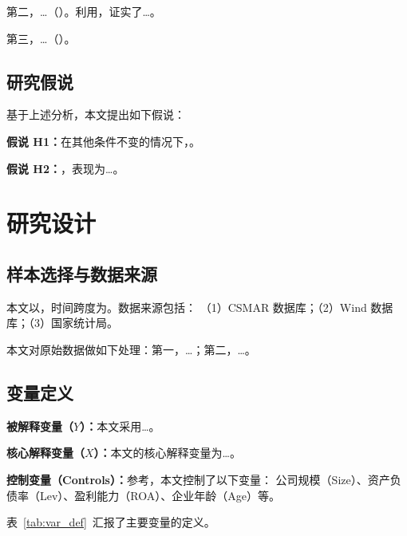 \documentclass[lang=cn, alanguage={chinese}, aaffiliation={中国}, aoptions={authoryear}]{ctexart}
\begin{document}
第二，\dots（\citealp{zzz}）。\citet{www}利用，证实了\dots。

第三，\dots（\citealp{vvv}）。

\subsection{研究假说}
\label{sec:hypothesis}

基于上述分析，本文提出如下假说：

\textbf{假说 H1：}在其他条件不变的情况下，。

\textbf{假说 H2：}，表现为\dots。

\section{研究设计}
\label{sec:design}

\subsection{样本选择与数据来源}
\label{sec:data}

本文以，时间跨度为。数据来源包括：
（1）CSMAR 数据库；（2）Wind 数据库；（3）国家统计局。

本文对原始数据做如下处理：第一，\dots；第二，\dots。

\subsection{变量定义}
\label{sec:var}

\textbf{被解释变量（$Y$）：}本文采用\dots。

\textbf{核心解释变量（$X$）：}本文的核心解释变量为\dots。

\textbf{控制变量（Controls）：}参考\citet{xxx}，本文控制了以下变量：
公司规模（Size）、资产负债率（Lev）、盈利能力（ROA）、企业年龄（Age）等。

表~\ref{tab:var_def}~汇报了主要变量的定义。
\end{document}
